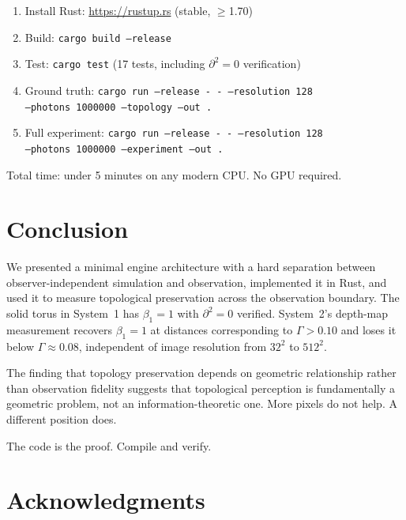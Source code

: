 \documentclass[11pt,a4paper]{article}
\theoremstyle{remark}
\begin{document}
\begin{enumerate}[leftmargin=*]
    \item Install Rust: \url{https://rustup.rs} (stable, $\geq$1.70)
    \item Build: \texttt{cargo build --release}
    \item Test: \texttt{cargo test} (17 tests, including $\partial^2 = 0$ verification)
    \item Ground truth: \texttt{cargo run --release -\,- --resolution 128}\\\texttt{--photons 1000000 --topology --out .}
    \item Full experiment: \texttt{cargo run --release -\,- --resolution 128}\\\texttt{--photons 1000000 --experiment --out .}
\end{enumerate}

Total time: under 5 minutes on any modern CPU. No GPU required.

\section{Conclusion}

We presented a minimal engine architecture with a hard separation between observer-independent simulation and observation, implemented it in Rust, and used it to measure topological preservation across the observation boundary. The solid torus in System~1 has $\beta_1 = 1$ with $\partial^2 = 0$ verified. System~2's depth-map measurement recovers $\beta_1 = 1$ at distances corresponding to $\Gamma > 0.10$ and loses it below $\Gamma \approx 0.08$, independent of image resolution from $32^2$ to $512^2$.

The finding that topology preservation depends on geometric relationship rather than observation fidelity suggests that topological perception is fundamentally a geometric problem, not an information-theoretic one. More pixels do not help. A different position does.

The code is the proof. Compile and verify.

\section*{Acknowledgments}
\end{document}
